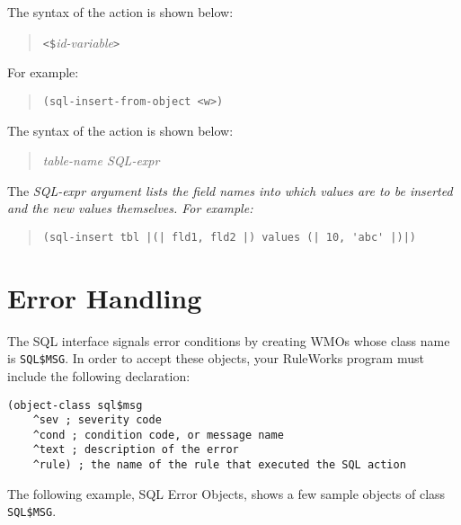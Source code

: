 The syntax of the  action is shown below:

\begin{quote}
   \verb|<$|\it{id-variable}\verb|>|
\end{quote}

For example:

\begin{quote}
\begin{verbatim}
(sql-insert-from-object <w>)
\end{verbatim}
\end{quote}

The syntax of the  action is shown below:

\begin{quote}
   \it{table-name} \it{SQL-expr}
\end{quote}

The \it{SQL-expr} argument lists the field names into which values are
to be inserted and the new values themselves. For example:

\begin{quote}
\begin{verbatim}
(sql-insert tbl |(| fld1, fld2 |) values (| 10, 'abc' |)|)
\end{verbatim}
\end{quote}

\section{Error Handling}

The SQL interface signals error conditions by creating WMOs whose
class name is
\verb|SQL$MSG|. In order to accept these objects, your RuleWorks
program must include the following  declaration:

\begin{exampl}
\begin{verbatim}
(object-class sql$msg
    ^sev ; severity code
    ^cond ; condition code, or message name
    ^text ; description of the error
    ^rule) ; the name of the rule that executed the SQL action
\end{verbatim}
\end{exampl}
   
The following example, SQL Error Objects, shows a few sample objects
of class \verb|SQL$MSG|.

